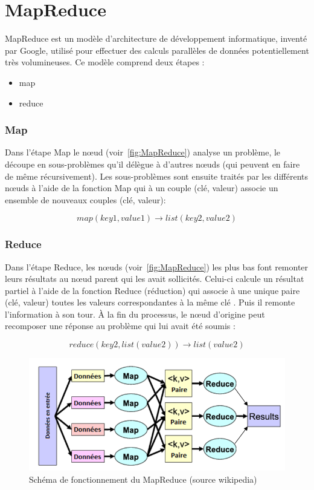 \section{MapReduce}

MapReduce est un modèle d'architecture de développement informatique, inventé par Google, utilisé pour effectuer des calculs parallèles de données potentiellement très volumineuses.
Ce modèle comprend deux étapes :
\begin{itemize}
	\item map
	\item reduce
\end{itemize}

\subsubsection{Map}

Dans l'étape Map le nœud (voir~\autoref{fig:MapReduce}) analyse un problème, le découpe en sous-problèmes qu'il délègue à d'autres nœuds (qui peuvent en faire de même récursivement).
Les sous-problèmes sont ensuite traités par les différents nœuds à l'aide de la fonction Map qui à un couple (clé, valeur) associe un ensemble de nouveaux couples (clé, valeur):

\begin{equation}
map(key1,value1) → list(key2,value2)
\end{equation}

\subsubsection{Reduce}

Dans l'étape Reduce, les nœuds (voir~\autoref{fig:MapReduce}) les plus bas font remonter leurs résultats au nœud parent qui les avait sollicités.
Celui-ci calcule un résultat partiel à l'aide de la fonction Reduce (réduction) qui associe à une unique paire (clé, valeur) toutes les valeurs correspondantes à la même clé .
Puis il remonte l'information à son tour.
À la fin du processus, le nœud d'origine peut recomposer une réponse au problème qui lui avait été soumis :

\begin{equation}
reduce(key2,list(value2))→ list(value2)
\end{equation}

\begin{figure}[htpb]
	\centering
	\includegraphics[scale = 0.5]{images/Mapreduce}
	\caption{Schéma de fonctionnement du MapReduce (source wikipedia)}
	\label{fig:MapReduce}
\end{figure}


